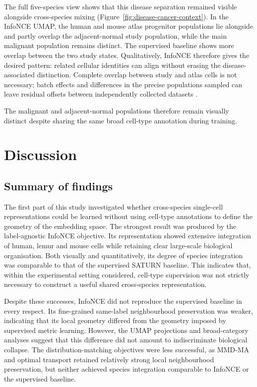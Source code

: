 \documentclass{article}
\begin{document}
The full five-species view shows that this disease separation remained visible alongside cross-species mixing (Figure~\ref{fig:disease-cancer-context}). In the InfoNCE UMAP, the human and mouse atlas progenitor populations lie alongside and partly overlap the adjacent-normal study population, while the main malignant population remains distinct. The supervised baseline shows more overlap between the two study states. Qualitatively, InfoNCE therefore gives the desired pattern: related cellular identities can align without erasing the disease-associated distinction. Complete overlap between study and atlas cells is not necessary; batch effects and differences in the precise populations sampled can leave residual offsets between independently collected datasets \cite{BatchEffects,BenchmarkingIntegration}.

The malignant and adjacent-normal populations therefore remain visually distinct despite sharing the same broad cell-type annotation during training.



\section{Discussion} 
\subsection{Summary of findings}


The first part of this study investigated whether cross-species single-cell representations could be learned without using cell-type annotations to define the geometry of the embedding space. The strongest result was produced by the label-agnostic InfoNCE objective. Its representation showed extensive integration of human, lemur and mouse cells while retaining clear large-scale biological organisation. Both visually and quantitatively, its degree of species integration was comparable to that of the supervised SATURN baseline. This indicates that, within the experimental setting considered, cell-type supervision was not strictly necessary to construct a useful shared cross-species representation.

Despite these successes, InfoNCE did not reproduce the supervised baseline in every respect. Its fine-grained same-label neighbourhood preservation was weaker, indicating that its local geometry differed from the geometry imposed by supervised metric learning. However, the UMAP projections and broad-category analyses suggest that this difference did not amount to indiscriminate biological collapse. The distribution-matching objectives were less successful, as MMD-MA and optimal transport retained relatively strong local neighbourhood preservation, but neither achieved species integration comparable to InfoNCE or the supervised baseline. 
\end{document}
